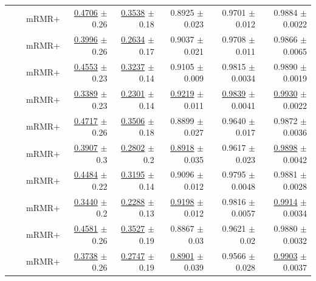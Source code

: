 \begin{longtable}{llp{}rrrrr}
 &  & mRMR+ & \underline{0.4706} {\scriptsize $\pm$ 0.26} & \underline{0.3538} {\scriptsize $\pm$ 0.18} & 0.8925 {\scriptsize $\pm$ 0.023} & 0.9701 {\scriptsize $\pm$ 0.012} & 0.9884 {\scriptsize $\pm$ 0.0022} \\
 &  & mRMR+ & \underline{0.3996} {\scriptsize $\pm$ 0.26} & \underline{0.2634} {\scriptsize $\pm$ 0.17} & 0.9037 {\scriptsize $\pm$ 0.021} & 0.9708 {\scriptsize $\pm$ 0.011} & 0.9866 {\scriptsize $\pm$ 0.0065} \\
 &  & mRMR+ & \underline{0.4553} {\scriptsize $\pm$ 0.23} & \underline{0.3237} {\scriptsize $\pm$ 0.14} & 0.9105 {\scriptsize $\pm$ 0.009} & 0.9815 {\scriptsize $\pm$ 0.0034} & 0.9890 {\scriptsize $\pm$ 0.0019} \\
 &  & mRMR+ & \underline{0.3389} {\scriptsize $\pm$ 0.23} & \underline{0.2301} {\scriptsize $\pm$ 0.14} & \underline{0.9219} {\scriptsize $\pm$ 0.011} & \underline{0.9839} {\scriptsize $\pm$ 0.0041} & \underline{0.9930} {\scriptsize $\pm$ 0.0022} \\
 &  & mRMR+ & \underline{0.4717} {\scriptsize $\pm$ 0.26} & \underline{0.3506} {\scriptsize $\pm$ 0.18} & 0.8899 {\scriptsize $\pm$ 0.027} & 0.9640 {\scriptsize $\pm$ 0.017} & 0.9872 {\scriptsize $\pm$ 0.0036} \\
 &  & mRMR+ & \underline{0.3907} {\scriptsize $\pm$ 0.3} & \underline{0.2802} {\scriptsize $\pm$ 0.2} & \underline{0.8918} {\scriptsize $\pm$ 0.035} & 0.9617 {\scriptsize $\pm$ 0.023} & \underline{0.9898} {\scriptsize $\pm$ 0.0042} \\
 &  & mRMR+ & \underline{0.4484} {\scriptsize $\pm$ 0.22} & \underline{0.3195} {\scriptsize $\pm$ 0.14} & 0.9096 {\scriptsize $\pm$ 0.012} & 0.9795 {\scriptsize $\pm$ 0.0048} & 0.9881 {\scriptsize $\pm$ 0.0028} \\
 &  & mRMR+ & \underline{0.3440} {\scriptsize $\pm$ 0.2} & \underline{0.2288} {\scriptsize $\pm$ 0.13} & \underline{0.9198} {\scriptsize $\pm$ 0.012} & 0.9816 {\scriptsize $\pm$ 0.0057} & \underline{0.9914} {\scriptsize $\pm$ 0.0034} \\
 &  & mRMR+ & \underline{0.4581} {\scriptsize $\pm$ 0.26} & \underline{0.3527} {\scriptsize $\pm$ 0.19} & 0.8867 {\scriptsize $\pm$ 0.03} & 0.9621 {\scriptsize $\pm$ 0.02} & 0.9880 {\scriptsize $\pm$ 0.0032} \\
 &  & mRMR+ & \underline{0.3738} {\scriptsize $\pm$ 0.26} & \underline{0.2747} {\scriptsize $\pm$ 0.19} & \underline{0.8901} {\scriptsize $\pm$ 0.039} & 0.9566 {\scriptsize $\pm$ 0.028} & \underline{0.9903} {\scriptsize $\pm$ 0.0037} \\

\end{longtable}

